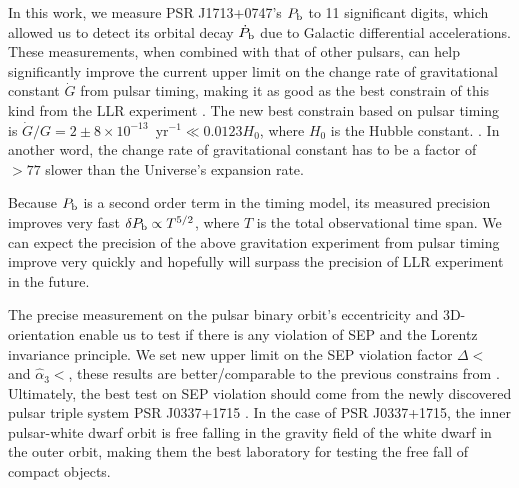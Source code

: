 In this work, we measure PSR J1713+0747's $P_{\rm b}$ to 11 significant
digits, which allowed us to detect its orbital decay $\dot{P}_{\rm b}$ due to Galactic differential accelerations.
These measurements, when combined with that of other pulsars, can help
significantly improve the current upper limit on the change rate of gravitational
 constant $\dot{G}$ from pulsar timing, making it as good as the best
constrain of this kind from the LLR experiment \citep{hmb10}.
The new best constrain based on pulsar timing is $\dot{G}/G
=2\pm8\times10^{-13}$~yr$^{-1}\ll0.0123H_0$, where $H_0$ is the Hubble constant. . 
In another word, the change rate of gravitational constant has to be a factor
of $>77$ slower than the Universe's expansion rate.

Because $P_{\rm b}$ is a second order term in the timing 
model, its measured precision improves very fast $\delta
P_{\rm b} \propto T^{5/2}$, where $T$ is the total observational time span.
We can expect the precision of the above gravitation experiment from pulsar
timing improve very quickly and hopefully will surpass the precision of LLR
experiment in the future.

The precise measurement on the pulsar binary orbit's eccentricity and
3D-orientation enable us to test if there is any violation of SEP and the
Lorentz invariance principle. We set new upper limit on the SEP violation
factor $\Delta <$ and $\hat{\alpha}_3< $, these results are better/comparable
to the previous constrains from \citealt{wex00, sns+05, sfl+05, gsf+11}.
Ultimately, the best test on SEP violation should come from the newly
discovered pulsar triple system PSR J0337+1715 \citep{rsa+14}. In the case of
PSR J0337+1715, the
inner pulsar-white dwarf orbit is free falling in the gravity field of the
white dwarf in the outer orbit, making them the best laboratory for testing
the free fall of compact objects.



